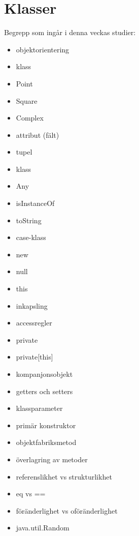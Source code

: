 \chapter{Klasser}\label{chapter:W05}
Begrepp som ingår i denna veckas studier:
\begin{multicols}{2}\begin{itemize}[noitemsep,label={$\square$},leftmargin=*]
\item objektorientering
\item klass
\item Point
\item Square
\item Complex
\item attribut (fält)
\item tupel
\item klass
\item Any
\item isInstanceOf
\item toString
\item case-klass
\item new
\item null
\item this
\item inkapsling
\item accessregler
\item private
\item private[this]
\item kompanjonsobjekt
\item getters och setters
\item klassparameter
\item primär konstruktor
\item objektfabriksmetod
\item överlagring av metoder
\item referenslikhet vs strukturlikhet
\item eq vs ==
\item föränderlighet vs oföränderlighet
\item java.util.Random\end{itemize}\end{multicols}
